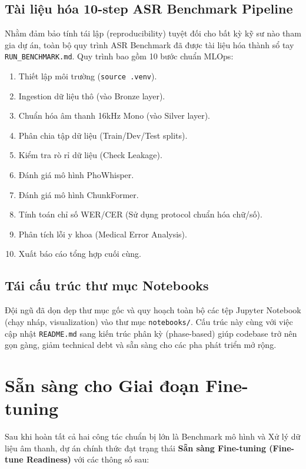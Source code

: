 \documentclass[12pt,a4paper]{article}
\begin{document}
\subsection{Tài liệu hóa 10-step ASR Benchmark Pipeline}
Nhằm đảm bảo tính tái lập (reproducibility) tuyệt đối cho bất kỳ kỹ sư nào tham gia dự án, toàn bộ quy trình ASR Benchmark đã được tài liệu hóa thành sổ tay \texttt{RUN\_BENCHMARK.md}. Quy trình bao gồm 10 bước chuẩn MLOps:
\begin{enumerate}[leftmargin=1.2cm]
    \item Thiết lập môi trường (\texttt{source .venv}).
    \item Ingestion dữ liệu thô (vào Bronze layer).
    \item Chuẩn hóa âm thanh 16kHz Mono (vào Silver layer).
    \item Phân chia tập dữ liệu (Train/Dev/Test splits).
    \item Kiểm tra rò rỉ dữ liệu (Check Leakage).
    \item Đánh giá mô hình PhoWhisper.
    \item Đánh giá mô hình ChunkFormer.
    \item Tính toán chỉ số WER/CER (Sử dụng protocol chuẩn hóa chữ/số).
    \item Phân tích lỗi y khoa (Medical Error Analysis).
    \item Xuất báo cáo tổng hợp cuối cùng.
\end{enumerate}

\subsection{Tái cấu trúc thư mục Notebooks}
Đội ngũ đã dọn dẹp thư mục gốc và quy hoạch toàn bộ các tệp Jupyter Notebook (chạy nháp, visualization) vào thư mục \texttt{notebooks/}. Cấu trúc này cùng với việc cập nhật \texttt{README.md} sang kiến trúc phân kỳ (phase-based) giúp codebase trở nên gọn gàng, giảm technical debt và sẵn sàng cho các pha phát triển mở rộng.

\section{Sẵn sàng cho Giai đoạn Fine-tuning}

Sau khi hoàn tất cả hai công tác chuẩn bị lớn là Benchmark mô hình và Xử lý dữ liệu âm thanh, dự án chính thức đạt trạng thái \textbf{Sẵn sàng Fine-tuning (Fine-tune Readiness)} với các thông số sau:
\end{document}
